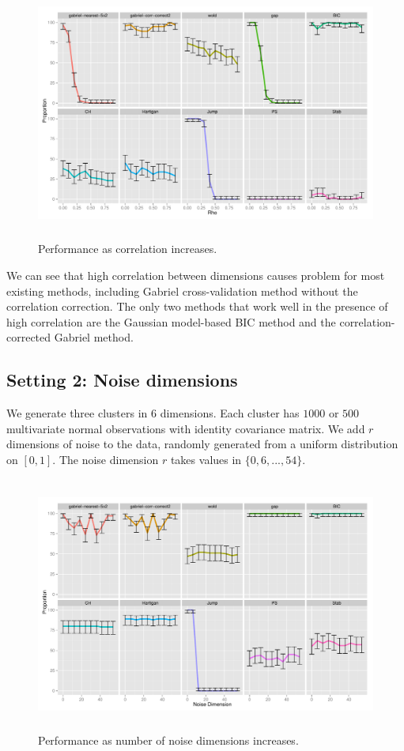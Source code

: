 \documentclass[12pt]{article}
\begin{document}
\begin{figure}[H]
\centering
\includegraphics[width=5.5in, height=3.3in]{New simulation/demo/bench/setting1/Facet.pdf}
\caption{Performance as correlation increases.}
\label{fig:setting1}
\end{figure}
	
We can see that high correlation between dimensions causes problem for most
existing methods, including Gabriel cross-validation method without the
correlation correction.  The only two methods that work well in the presence
of high correlation are the Gaussian model-based BIC method
\citep{fraley2002model} and the correlation-corrected Gabriel method. 


\subsection{Setting 2: Noise dimensions}

We generate three clusters in $6$ dimensions. Each cluster has $1000$ or $500$
multivariate normal observations with identity covariance matrix.
We add $r$ dimensions of noise to the data, randomly generated from a uniform
distribution on $[0,1]$. The noise dimension $r$ takes values in
$\{0,6,...,54\}$. 
	
\begin{figure}[H]
\centering
\includegraphics[width=5.5in, height=3.3in]{New simulation/demo/bench/setting2/Facet.pdf}
\caption{Performance as number of noise dimensions increases.}
\label{fig:setting2}
\end{figure}
\end{document}
